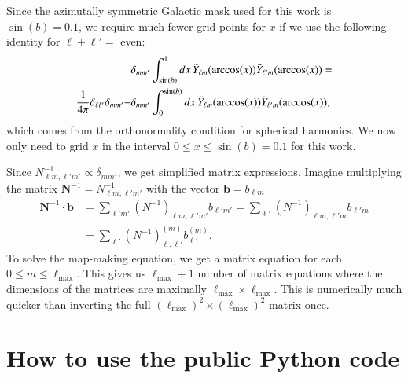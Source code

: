 \documentclass[twocolumn]{../common/aa}
\begin{document}
Since the azimutally symmetric Galactic mask used for this work is $\sin(b) = 0.1$, we require much fewer grid points for $x$ if we use the following identity for $\ell+\ell' = $ even:
\begin{align}
&\delta_{mm'} \int_{\sin(b)}^{1} dx \, \Tilde{Y}_{\ell m}(\arccos(x)) \Tilde{Y}_{\ell' m}(\arccos(x)) = \\
\frac{1}{4\pi}\delta_{\ell \ell'}\delta_{m m'} - &\delta_{mm'} \int_{0}^{\sin(b)} dx \, \Tilde{Y}_{\ell m}(\arccos(x)) \Tilde{Y}_{\ell' m}(\arccos(x)),
\end{align}
which comes from the orthonormality condition for spherical harmonics. We now only need to grid $x$ in the interval $0\leq x \leq \sin(b) = 0.1$ for this work.

Since $N^{-1}_{\ell m, \ell' m'} \propto \delta_{m m'}$, we get simplified matrix expressions. Imagine multiplying the matrix $\textbf{N}^{-1} = N^{-1}_{\ell m, \ell' m'}$ with the vector $\textbf{b} = b_{\ell m}$
\begin{align}
\textbf{N}^{-1} \cdot \textbf{b} &= \sum_{\ell' m'}\left(N^{-1}\right)_{\ell m, \ell' m'}b_{\ell' m'} = \sum_{\ell'}\left(N^{-1}\right)_{\ell m, \ell' m}b_{\ell' m}\\
&= \sum_{\ell' }\left(N^{-1}\right)^{(m)}_{\ell, \ell'}b^{(m)}_{\ell'}.
\end{align}
To solve the map-making equation, we get a matrix equation for each $0 \leq m \leq \ell_{\mathrm{max}}$. This gives us $\ell_{\textrm{max}}+1$ number of matrix equations where the dimensions of the matrices are maximally $\ell_{\textrm{max}} \times \ell_{\textrm{max}}$. This is numerically much quicker than inverting the full $(\ell_{\textrm{max}})^2 \times (\ell_{\textrm{max}})^2$ matrix once.

\section{How to use the public Python code}
\label{sec:appendixB}
\end{document}
